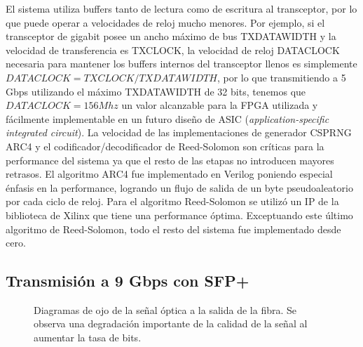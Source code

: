  

El sistema utiliza buffers tanto de lectura como de escritura al transceptor, por lo que puede operar a velocidades de reloj mucho menores. Por ejemplo, si el transceptor de gigabit posee un ancho máximo de bus TXDATAWIDTH y la velocidad de transferencia es TXCLOCK, la velocidad de reloj DATACLOCK necesaria para mantener los buffers internos del transceptor llenos es simplemente $DATACLOCK=TXCLOCK/TXDATAWIDTH$, por lo que transmitiendo a 5 Gbps utilizando el máximo TXDATAWIDTH de 32 bits, tenemos que $DATACLOCK=156Mhz$ un valor alcanzable para la FPGA utilizada y fácilmente implementable en un futuro diseño de ASIC (\textit{application-specific integrated circuit}).
La velocidad de las implementaciones de generador CSPRNG ARC4 y el codificador/decodificador de Reed-Solomon son críticas para la performance del sistema ya que el resto de las etapas no introducen mayores retrasos. El algoritmo ARC4 fue implementado en Verilog poniendo especial énfasis en la performance, logrando un flujo de salida de un byte pseudoaleatorio por cada ciclo de reloj. Para el algoritmo Reed-Solomon se utilizó un IP de la biblioteca de Xilinx que tiene una performance óptima. Exceptuando este último algoritmo de Reed-Solomon, todo el resto del sistema fue implementado desde cero.


\subsection{Transmisión a 9 Gbps con SFP+}

\begin{figure}[!t]
   \centering
   \qquad
   \qquad
  \caption {Diagramas de ojo de la señal óptica a la salida de la fibra. Se observa una degradación importante de la calidad de la señal al aumentar la tasa de bits.}
  \label{fig:ImgOjo}
\end{figure}


